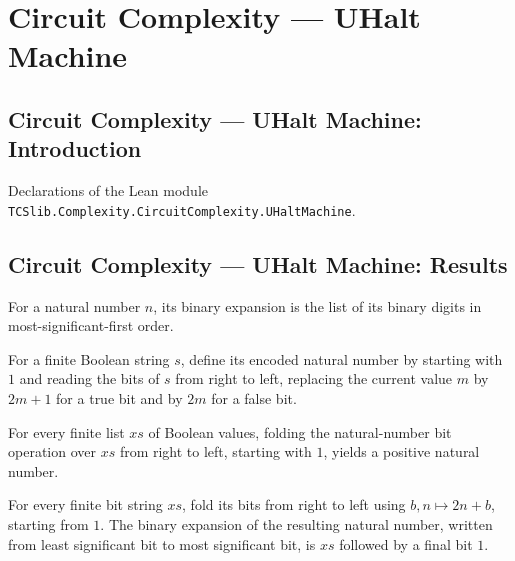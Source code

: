 \section{Circuit Complexity --- UHalt Machine}
\subsection*{Circuit Complexity --- UHalt Machine: Introduction}

Declarations of the Lean module \texttt{TCSlib.Complexity.CircuitComplexity.UHaltMachine}.

\subsection*{Circuit Complexity --- UHalt Machine: Results}

\begin{definition}
\label{Complexity.binaryExpansion}
\leanok
For a natural number $n$, its binary expansion is the list of its binary digits in
most-significant-first order.
\end{definition}

\begin{definition}
\label{Complexity.numOfString}
\leanok
For a finite Boolean string $s$, define its encoded natural number by starting with $1$
and reading the bits of $s$ from right to left, replacing the current value $m$ by
$2m+1$ for a true bit and by $2m$ for a false bit.
\end{definition}

\begin{lemma}
\label{Complexity.foldr_bit_one_pos}
\leanok
{}
For every finite list $xs$ of Boolean values, folding the natural-number bit operation
over $xs$ from right to left, starting with $1$, yields a positive natural number.
\end{lemma}

\begin{lemma}
\label{Complexity.bits_foldr_bit_one}
\leanok
{}
For every finite bit string $xs$, fold its bits from right to left using $b,n\mapsto
2n+b$, starting from $1$. The binary expansion of the resulting natural number, written
from least significant bit to most significant bit, is $xs$ followed by a final bit $1$.
\end{lemma}

